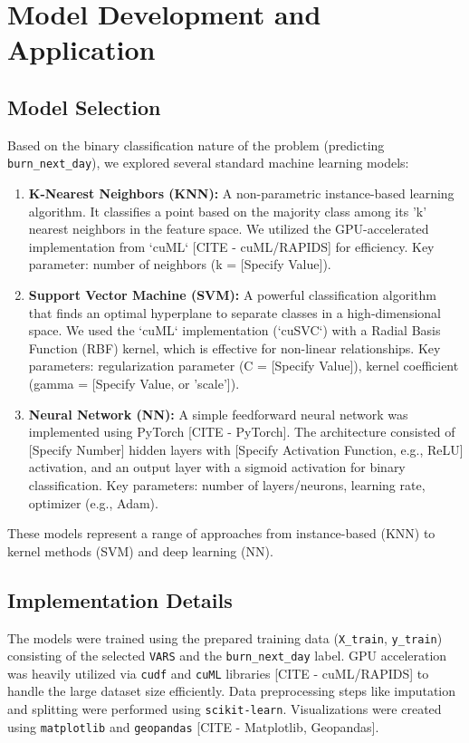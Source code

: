 \documentclass[conference]{IEEEtran}
\begin{document}
\section{Model Development and Application}
\subsection{Model Selection}
Based on the binary classification nature of the problem (predicting \texttt{burn\_next\_day}), we explored several standard machine learning models:

\begin{enumerate}
    \item \textbf{K-Nearest Neighbors (KNN):} A non-parametric instance-based learning algorithm. It classifies a point based on the majority class among its 'k' nearest neighbors in the feature space. We utilized the GPU-accelerated implementation from `cuML` [CITE - cuML/RAPIDS] for efficiency. Key parameter: number of neighbors (k = [Specify Value]).
    \item \textbf{Support Vector Machine (SVM):} A powerful classification algorithm that finds an optimal hyperplane to separate classes in a high-dimensional space. We used the `cuML` implementation (`cuSVC`) with a Radial Basis Function (RBF) kernel, which is effective for non-linear relationships. Key parameters: regularization parameter (C = [Specify Value]), kernel coefficient (gamma = [Specify Value, or 'scale']).
    \item \textbf{Neural Network (NN):} A simple feedforward neural network was implemented using PyTorch [CITE - PyTorch]. The architecture consisted of [Specify Number] hidden layers with [Specify Activation Function, e.g., ReLU] activation, and an output layer with a sigmoid activation for binary classification. Key parameters: number of layers/neurons, learning rate, optimizer (e.g., Adam).
\end{enumerate}
These models represent a range of approaches from instance-based (KNN) to kernel methods (SVM) and deep learning (NN).

\subsection{Implementation Details}
The models were trained using the prepared training data (\texttt{X\_train}, \texttt{y\_train}) consisting of the selected \texttt{VARS} and the \texttt{burn\_next\_day} label. GPU acceleration was heavily utilized via \texttt{cudf} and \texttt{cuML} libraries [CITE - cuML/RAPIDS] to handle the large dataset size efficiently. Data preprocessing steps like imputation and splitting were performed using \texttt{scikit-learn}. Visualizations were created using \texttt{matplotlib} and \texttt{geopandas} [CITE - Matplotlib, Geopandas].
\end{document}
